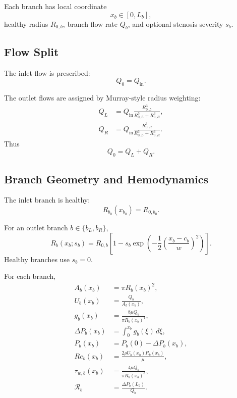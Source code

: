 \documentclass[11pt]{article}
\begin{document}
Each branch has local coordinate
\begin{equation}
    x_b\in[0,L_b],
\end{equation}
healthy radius $R_{0,b}$, branch flow rate $Q_b$, and optional stenosis severity $s_b$.

\subsection{Flow Split}

The inlet flow is prescribed:
\begin{equation}
    Q_0 = Q_{\mathrm{in}}.
\end{equation}

The outlet flows are assigned by Murray-style radius weighting:
\begin{align}
    Q_L
    &=
    Q_{\mathrm{in}}
    \frac{R_{0,L}^{3}}
    {R_{0,L}^{3}+R_{0,R}^{3}},
    \\
    Q_R
    &=
    Q_{\mathrm{in}}
    \frac{R_{0,R}^{3}}
    {R_{0,L}^{3}+R_{0,R}^{3}}.
\end{align}
Thus
\begin{equation}
    Q_0 = Q_L + Q_R.
\end{equation}

\subsection{Branch Geometry and Hemodynamics}

The inlet branch is healthy:
\begin{equation}
    R_{b_0}(x_{b_0})=R_{0,b_0}.
\end{equation}

For an outlet branch $b\in\{b_L,b_R\}$,
\begin{equation}
    R_b(x_b;s_b)
    =
    R_{0,b}
    \left[
        1
        -
        s_b
        \exp
        \left(
            -\frac{1}{2}
            \left(
                \frac{x_b-c_b}{w}
            \right)^2
        \right)
    \right].
\end{equation}
Healthy branches use $s_b=0$.

For each branch,
\begin{align}
    A_b(x_b) &= \pi R_b(x_b)^2,\\
    U_b(x_b) &= \frac{Q_b}{A_b(x_b)},\\
    g_b(x_b) &= \frac{8\mu Q_b}{\pi R_b(x_b)^4},\\
    \Delta P_b(x_b) &= \int_{0}^{x_b}g_b(\xi)\,d\xi,\\
    P_b(x_b) &= P_b(0)-\Delta P_b(x_b),\\
    Re_b(x_b) &= \frac{2\rho U_b(x_b)R_b(x_b)}{\mu},\\
    \tau_{w,b}(x_b) &= \frac{4\mu Q_b}{\pi R_b(x_b)^3},\\
    \mathcal{R}_b &= \frac{\Delta P_b(L_b)}{Q_b}.
\end{align}
\end{document}
